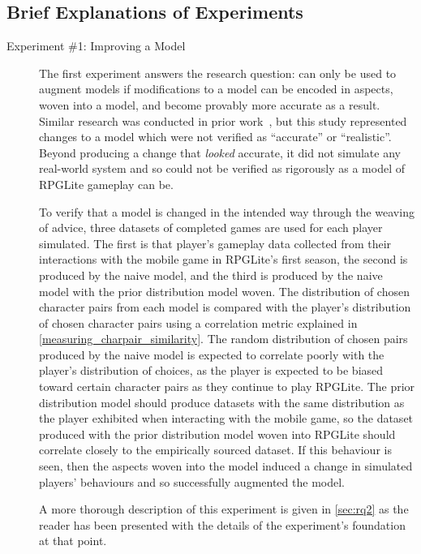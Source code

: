 \subsection{Brief Explanations of Experiments}
\label{experiments_introduced_briefly}

\begin{description}
  \item[Experiment \#1: Improving a Model] The first experiment answers the
research question: \emph{\rqone{}} \Aop{} can only be used to augment models if
modifications to a model can be encoded in aspects, woven into a model, and
become provably more accurate as a result. Similar research was conducted in
prior work~\cite{wallis2018caise}, but this study represented changes to a model
which were not verified as ``accurate'' or ``realistic''. Beyond producing a
change that \emph{looked} accurate, it did not simulate any real-world system
and so could not be verified as rigorously as a model of RPGLite gameplay can
be.

To verify that a model is changed in the intended way through the weaving of
advice, three datasets of completed games are used for each player simulated.
The first is that player's gameplay data collected from their interactions with
the mobile game in RPGLite's first season, the second is produced by the naive
model, and the third is produced by the naive model with the prior distribution
model woven. The distribution of chosen character pairs from each model is
compared with the player's distribution of chosen character pairs using a
correlation metric explained in \cref{measuring_charpair_similarity}. The random
distribution of chosen pairs produced by the naive model is expected to
correlate poorly with the player's distribution of choices, as the player is
expected to be biased toward certain character pairs as they continue to play
RPGLite. The prior distribution model should produce datasets with the same
distribution as the player exhibited when interacting with the mobile game, so
the dataset produced with the prior distribution model woven into RPGLite should
correlate closely to the empirically sourced dataset. If this behaviour is seen,
then the aspects woven into the model induced a change in simulated players'
behaviours and so successfully augmented the model.

A more thorough description of this experiment is given in \cref{sec:rq2} as the
reader has been presented with the details of the experiment's foundation at
that point.
  

\end{description}
